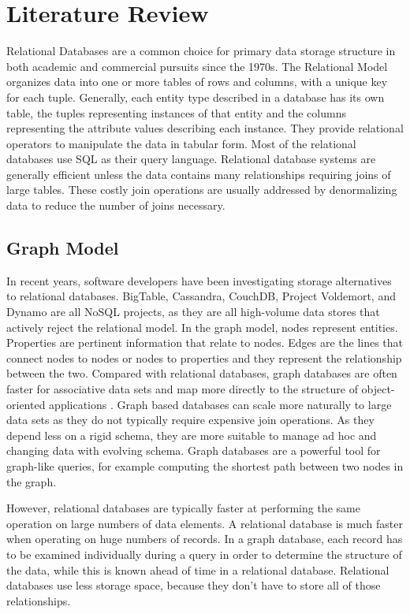 \documentclass[12pt, oneside]{book}
\begin{document}
\chapter{Literature Review}
Relational Databases are a common choice for primary data storage structure in both academic and commercial pursuits since the 1970s. The Relational Model organizes data into one or more tables of rows and columns, with a unique key for each tuple. Generally, each entity type described in a database has its own table, the tuples representing instances of that entity and the columns representing the attribute values describing each instance. They provide relational operators to manipulate the data in tabular form. Most of the relational databases use SQL as their query language. Relational database systems are generally efficient unless the data contains many relationships requiring joins of large tables. These costly join operations are usually addressed by denormalizing data to reduce the number of joins necessary.  
\section{Graph Model}
In recent years, software developers have been investigating storage alternatives to relational databases. BigTable, Cassandra, CouchDB, Project Voldemort, and Dynamo are all NoSQL projects, as they are all high-volume data stores that actively reject the relational model. In the graph model, nodes represent entities. Properties are pertinent information that relate to nodes. Edges are the lines that connect nodes to nodes or nodes to properties and they represent the relationship between the two. Compared with relational databases, graph databases are often faster for associative data sets and map more directly to the structure of object-oriented applications \cite{object_graph}. Graph based databases can scale more naturally to large data sets as they do not typically require expensive join operations. As they depend less on a rigid schema, they are more suitable to manage ad hoc and changing data with evolving schema. Graph databases are a powerful tool for graph-like queries, for example computing the shortest path between two nodes in the graph.\\
\par
However, relational databases are typically faster at performing the same operation on large numbers of data elements. A relational database is much faster when operating on huge numbers of records. In a graph database, each record has to be examined individually during a query in order to determine the structure of the data, while this is known ahead of time in a relational database. Relational databases use less storage space, because they don't have to store all of those relationships.
\end{document}
